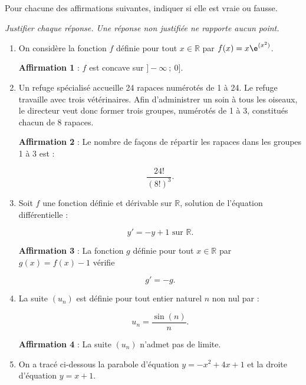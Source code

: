 Pour chacune des affirmations suivantes, indiquer si elle est vraie ou fausse.

\emph{Justifier chaque réponse. Une réponse non justifiée ne rapporte aucun point.}

\medskip

\begin{enumerate}
\item On considère la fonction $f$ définie pour tout $x \in \mathbb{R}$ par $f(x) = x \e^{(x^2)}$.

\textbf{Affirmation 1} : $f$ est concave sur $]-\infty~;~0]$.

\item Un refuge spécialisé accueille 24 rapaces numérotés de 1 à 24. Le refuge travaille avec trois vétérinaires. Afin d'administrer un soin à tous les oiseaux, le directeur veut donc former trois groupes, numérotés de 1 à 3, constitués chacun de 8 rapaces.

\textbf{Affirmation 2} : Le nombre de façons de répartir les rapaces dans les groupes 1 à 3 est :

\[\frac{24!}{(8!)^3}.\]

\item Soit $f$ une fonction définie et dérivable sur $\mathbb{R}$, solution de l'équation différentielle :

\[y' = -y + 1 \text{ sur } \mathbb{R}.\]

\textbf{Affirmation 3} : La fonction $g$ définie pour tout $x \in \mathbb{R}$ par $g(x) = f(x) - 1$ vérifie

\[g' = -g.\]

\item La suite $(u_n)$ est définie pour tout entier naturel $n$ non nul par :

\[u_n = \frac{\sin(n)}{n}.\]

\textbf{Affirmation 4} : La suite $(u_n)$ n'admet pas de limite.

\item On a tracé ci-dessous la parabole d'équation $y = -x^2 + 4x + 1$ et la droite d'équation $y = x + 1$.


\end{enumerate}
